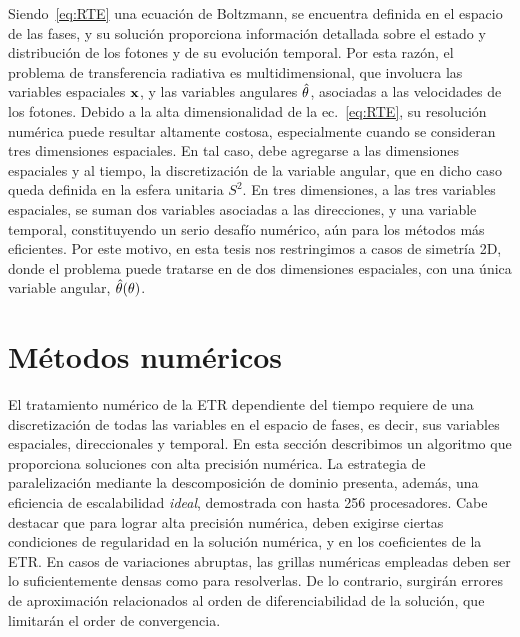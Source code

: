 Siendo~\eqref{eq:RTE} una ecuación de Boltzmann, 
se encuentra definida en el espacio de las fases, 
y su solución proporciona información detallada sobre el estado y distribución 
de los fotones y de su evolución temporal. Por esta razón, 
el problema de transferencia radiativa es multidimensional, 
que involucra las variables espaciales $\mathbf{x}$, y las variables angulares 
$\hat{\theta}$, asociadas a las velocidades de los fotones. 
Debido a la alta dimensionalidad de la ec.~\eqref{eq:RTE}, su resolución numérica 
puede resultar altamente costosa, especialmente cuando se consideran 
tres dimensiones espaciales. En tal caso, debe agregarse a las dimensiones 
espaciales y al tiempo, la discretización de la variable angular, 
que en dicho caso queda definida en la esfera unitaria $S^2$. 
En tres dimensiones, a las tres variables espaciales, se suman 
dos variables asociadas a las direcciones, y una variable temporal, 
constituyendo un serio desafío numérico,  
aún para los métodos más eficientes. 
Por este motivo, en esta tesis nos restringimos a casos de 
simetría 2D, donde el 
problema puede tratarse en de dos dimensiones espaciales, 
con una única variable angular, $\hat{\theta}(\theta)$.


\section{Métodos numéricos}
\label{sec:nummet}

El tratamiento numérico de la ETR dependiente del tiempo
requiere de una discretización de todas las variables en el espacio de fases,
 es decir, sus variables espaciales, direccionales y temporal. 
En esta sección describimos un algoritmo que proporciona 
soluciones con alta precisión numérica. La estrategia 
de paralelización mediante  
la descomposición de dominio presenta, además, una eficiencia 
de escalabilidad \textit{ideal}, demostrada con hasta 256 procesadores. 
Cabe destacar que para lograr alta precisión numérica, 
deben exigirse ciertas condiciones de regularidad 
en la solución numérica, y en los coeficientes 
de la ETR. En casos de variaciones abruptas, 
las grillas numéricas empleadas deben ser 
lo suficientemente densas como para resolverlas. 
 De lo contrario, surgirán errores de aproximación 
 relacionados al orden de diferenciabilidad de la solución,
 que limitarán el order de convergencia. 

